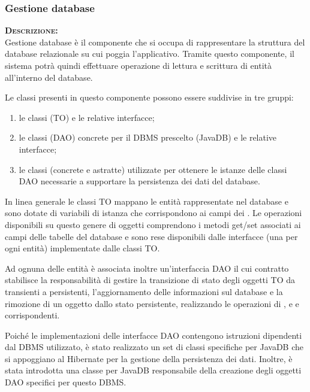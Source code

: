 \subsubsection{Gestione database}
\begin{description}
\item{\scshape\bfseries Descrizione:}\\
Gestione database è il componente che si occupa di rappresentare la struttura del database relazionale su cui poggia l'applicativo. Tramite questo componente, il sistema potrà quindi effettuare operazione di lettura e scrittura di entità all'interno del database.

Le classi presenti in questo componente possono essere suddivise in tre gruppi:
\begin{enumerate}
  \item le classi  (TO) e le relative interfacce;
  \item le classi  (DAO) concrete per il DBMS prescelto (JavaDB) e le relative interfacce;
  \item le classi  (concrete e astratte) utilizzate per ottenere le istanze delle classi DAO necessarie a supportare la persistenza dei dati del database.
\end{enumerate}

In linea generale le classi TO mappano le entità rappresentate nel database e sono dotate di variabili di istanza che corrispondono ai campi dei . Le operazioni disponibili su questo genere di oggetti comprendono i metodi get/set associati ai campi delle tabelle del database e sono rese disponibili dalle interfacce (una per ogni entità) implementate dalle classi TO\@.

Ad ognuna delle entità è associata inoltre un'interfaccia DAO il cui contratto stabilisce la responsabilità di gestire la transizione di stato degli oggetti TO da transienti a persistenti, l'aggiornamento delle informazioni sul database e la rimozione di un oggetto dallo stato persistente, realizzando le operazioni di ,  e  e  corrispondenti.

Poiché le implementazioni delle interfacce DAO contengono istruzioni dipendenti dal DBMS utilizzato, è stato realizzato un set di classi specifiche per JavaDB che si appoggiano al  Hibernate per la gestione della persistenza dei dati. Inoltre, è stata introdotta una classe  per JavaDB responsabile della creazione degli oggetti DAO specifici per questo DBMS\@.


\end{description}
